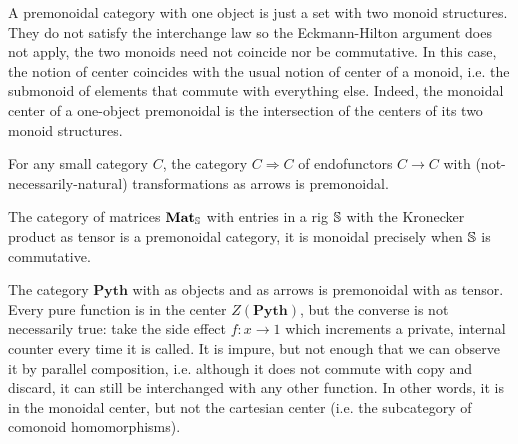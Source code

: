 \begin{example}
A premonoidal category with one object is just a set with two monoid structures.
They do not satisfy the interchange law so the Eckmann-Hilton argument does not apply, the two monoids need not coincide nor be commutative.
In this case, the notion of center coincides with the usual notion of center of a monoid, i.e. the submonoid of elements that commute with everything else.
Indeed, the monoidal center of a one-object premonoidal is the intersection of the centers of its two monoid structures.
\end{example}

\begin{example}
For any small category $C$, the category $C \Rightarrow C$ of endofunctors $C \to C$ with (not-necessarily-natural) transformations as arrows is premonoidal.
\end{example}

\begin{example}
The category of matrices $\mathbf{Mat}_\S$ with entries in a rig $\S$ with the Kronecker product as tensor is a premonoidal category, it is monoidal precisely when $\S$ is commutative.
\end{example}

\begin{example}
The category $\mathbf{Pyth}$ with  as objects and  as arrows is premonoidal with  as tensor.
Every pure function is in the center $Z(\mathbf{Pyth})$, but the converse is not necessarily true: take the side effect $f : x \to 1$ which increments a private, internal counter every time it is called.
It is impure, but not enough that we can observe it by parallel composition, i.e. although it does not commute with copy and discard, it can still be interchanged with any other function.
In other words, it is in the monoidal center, but not the cartesian center (i.e. the subcategory of comonoid homomorphisms).
\end{example}

